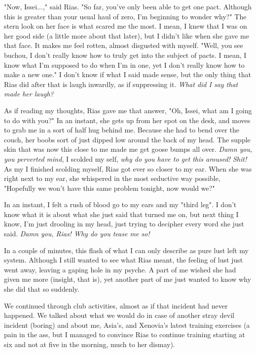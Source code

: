 \documentclass{article}
\begin{document}
"Now, Issei...," said Rias. "So far, you've only been able to get one pact. Although this is greater than your usual haul of zero, I'm beginning to wonder why?" The stern look on her face is what scared me the most. I mean, I knew that I was on her good side (a little more about that later), but I didn't like when she gave me that face. It makes me feel rotten, almost disgusted with myself. "Well, you see buchou, I don't really know how to truly get into the subject of pacts. I mean, I know what I'm supposed to do when I'm in one, yet I don't really know how to make a new one." I don't know if what I said made sense, but the only thing that Rias did after that is laugh inwardly, as if suppressing it. \emph{What did I say that made her laugh?}

As if reading my thoughts, Rias gave me that answer, "Oh, Issei, what am I going to do with you?" In an instant, she gets up from her spot on the desk, and moves to grab me in a sort of half hug behind me. Because she had to bend over the couch, her boobs sort of just dipped low around the back of my head. The supple skin that was now this close to me made me get goose bumps all over. \emph{Damn you, you perverted mind}, I scolded my self, \emph{why do you have to get this aroused! Shit!} As my I finished scolding myself, Rias got ever so closer to my ear. When she was right next to my ear, she whispered in the most seductive way possible, "Hopefully we won't have this same problem tonight, now would we?"

In an instant, I felt a rush of blood go to my ears and my "third leg". I don't know what it is about what she just said that turned me on, but next thing I know, I'm just drooling in my head, just trying to decipher every word she just said. \emph{Damn you, Rias! Why do you tease me so!}

In a couple of minutes, this flash of what I can only describe as pure lust left my system. Although I still wanted to see what Rias meant, the feeling of lust just went away, leaving a gaping hole in my psyche. A part of me wished she had given me more (insight, that is), yet another part of me just wanted to know why she did that so suddenly.

We continued through club activities, almost as if that incident had never happened. We talked about what we would do in case of another stray devil incident (boring) and about me, Asia's, and Xenovia's latest training exercises (a pain in the ass, but I managed to convince Rias to continue training starting at six and not at five in the morning, much to her dismay).
\end{document}
